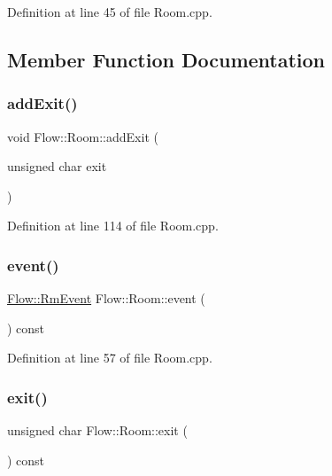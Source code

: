 Definition at line 45 of file Room.\+cpp.



\subsection{Member Function Documentation}
\hypertarget{class_flow_1_1_room_ac6f5f04b58afe0002ced970c6068c503}{}\label{class_flow_1_1_room_ac6f5f04b58afe0002ced970c6068c503} 
\subsubsection{\texorpdfstring{add\+Exit()}{addExit()}}
{\footnotesize\ttfamily void Flow\+::\+Room\+::add\+Exit (\begin{DoxyParamCaption}\item[{unsigned char}]{exit }\end{DoxyParamCaption})}



Definition at line 114 of file Room.\+cpp.

\hypertarget{class_flow_1_1_room_a5f32585a64d31afb8add2d20eb884a85}{}\label{class_flow_1_1_room_a5f32585a64d31afb8add2d20eb884a85} 
\subsubsection{\texorpdfstring{event()}{event()}}
{\footnotesize\ttfamily \hyperlink{namespace_flow_a01e62c2d0a9c24924a2fce4b667dd9d8}{Flow\+::\+Rm\+Event} Flow\+::\+Room\+::event (\begin{DoxyParamCaption}{ }\end{DoxyParamCaption}) const}



Definition at line 57 of file Room.\+cpp.

\hypertarget{class_flow_1_1_room_afddbff9ee70421d5df3dbbf202afe35f}{}\label{class_flow_1_1_room_afddbff9ee70421d5df3dbbf202afe35f} 
\subsubsection{\texorpdfstring{exit()}{exit()}}
{\footnotesize\ttfamily unsigned char Flow\+::\+Room\+::exit (\begin{DoxyParamCaption}{ }\end{DoxyParamCaption}) const}



